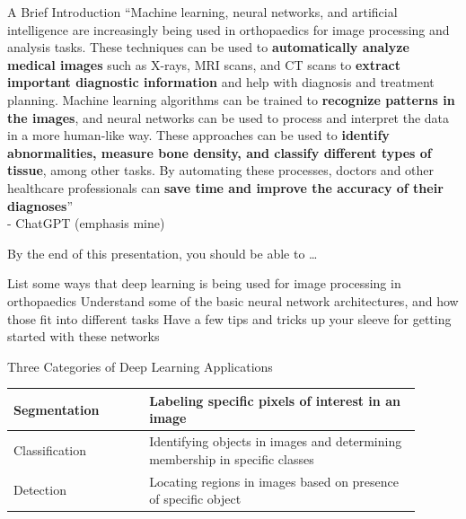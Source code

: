 \begin{frame}{A Brief Introduction}
   ``Machine learning, neural networks, and artificial intelligence are increasingly being used in orthopaedics for image processing and analysis tasks. These techniques can be used to {\bf automatically analyze medical images} such as X-rays, MRI scans, and CT scans to {\bf extract important diagnostic information} and help with diagnosis and treatment planning. Machine learning algorithms can be trained to {\bf recognize patterns in the images}, and neural networks can be used to process and interpret the data in a more human-like way. These approaches can be used to {\bf identify abnormalities, measure bone density, and classify different types of tissue}, among other tasks. By automating these processes, doctors and other healthcare professionals can {\bf save time and improve the accuracy of their diagnoses}'' \\
\vspace{5mm}
   \hfill - ChatGPT (emphasis mine)
\end{frame}

\begin{frame}{By the end of this presentation, you should be able to \dots}
   \begin{baseitemize}
      \itemR List some ways that deep learning is being used for image processing in orthopaedics
      \itemR Understand some of the basic neural network architectures, and how those fit into different tasks
      \itemR Have a few tips and tricks up your sleeve for getting started with these networks
   \end{baseitemize}
\end{frame}

\begin{frame}{Three Categories of Deep Learning Applications}
   \renewcommand{\arraystretch}{2}
   \begin{center}
            \begin{tabular}{M{0.3\linewidth}|P{0.6\linewidth}}
               \pause Segmentation & Labeling specific pixels of interest in an image \pause \\ \hline
               Classification & Identifying objects in images and determining membership in specific classes \pause \\ \hline
               Detection & Locating regions in images based on presence of specific object
            \end{tabular}
      \end{center}
\end{frame}

